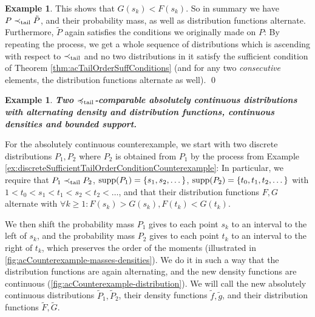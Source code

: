 \documentclass[a4paper,DIV=11,abstracton,twoside=semi]{scrreprt}
\theoremstyle{definition}
\newtheorem{ex}[thm]{Example} %
\begin{document}
\begin{ex}
        This shows that $G(s_k) < F(s_k)$. 
        So in summary we have $P \prec_{\text{tail}} \tilde{P}$, and their probability mass, as well as distribution functions alternate.
        Furthermore, $\tilde{P}$ again satisfies the conditions we originally made on $P$: By repeating the process, we get a whole sequence of distributions which is ascending with respect to $\prec_{\text{tail}}$ and no two distributions in it satisfy the sufficient condition of Theorem \ref{thm:acTailOrderSuffConditions} (and for any two \emph{consecutive} elements, the distribution functions alternate as well).
        \qed
    \end{ex}
    \newpage
    \begin{ex}
        \textbf{
            \textsl{Two $\preccurlyeq_{\text{tail}}$-comparable absolutely continuous distributions with alternating density and distribution functions, continuous densities and bounded support.}
        }
        
        \label{ex:acSufficientTailOrderConditionCounterexample}
        For the absolutely continuous counterexample, we start with two discrete distributions $P_1, P_2$ where $P_2$ is obtained from $P_1$ by the process from Example \ref{ex:discreteSufficientTailOrderConditionCounterexample}: In particular, we require that $P_1 \prec_{\text{tail}} P_2$, $\operatorname{supp}(P_1) = \{s_1, s_2, \dots\}$, $\operatorname{supp}(P_2) = \{t_0, t_1, t_2, \dots\}$ with $1 < t_0 < s_1 < t_1 < s_2 < t_2 < \dots$, and that their distribution functions $F, G$ alternate with $\forall k \geq 1: F(s_k) > G(s_k), F(t_k) < G(t_k)$.
        
        We then shift the probability mass $P_1$ gives to each point $s_k$ to an interval to the left of $s_k$, and the probability mass $P_2$ gives to each point $t_k$ to an interval to the right of $t_k$, which preserves the order of the moments (illustrated in \autoref{fig:acCounterexample-masses-densities}). We do it in such a way that the distribution functions are again alternating, and the new density functions are continuous (\autoref{fig:acCounterexample-distribution}). We will call the new absolutely continuous distributions $\tilde{P}_1, \tilde{P}_2$, their density functions $\tilde{f}, \tilde{g}$, and their distribution functions $\tilde{F}, \tilde{G}$.
        

\end{ex}
\end{document}
